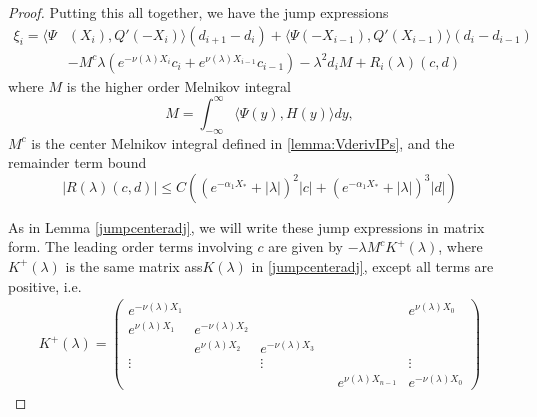\documentclass[thesis.tex]{subfiles}
\begin{document}
\begin{lemma}
\begin{proof}
Putting this all together, we have the jump expressions
\begin{align*}
\xi_i = \langle \Psi&(X_i), Q'(-X_i) \rangle (d_{i+1} - d_i ) + \langle \Psi(-X_{i-1}), Q'(X_{i-1}) \rangle (d_i - d_{i-1} ) \\
&- M^c \lambda( e^{-\nu(\lambda)X_i}c_i + e^{\nu(\lambda)X_{i-1}}c_{i-1})
- \lambda^2 d_i M + R_i(\lambda)(c, d)
\end{align*}
where $M$ is the higher order Melnikov integral
\[
M = \int_{-\infty}^\infty \langle \Psi(y), H(y) \rangle dy,
\]
$M^c$ is the center Melnikov integral defined in \cref{lemma:VderivIPs}, and the remainder term bound
\begin{equation}\label{noncenterR}
|R(\lambda)(c, d)| \leq C \left( (e^{-\alpha_1 X_*} + |\lambda|)^2 |c| + (e^{-\alpha_1 X_*} + |\lambda|)^3 |d| \right)
\end{equation}

As in Lemma \ref{jumpcenteradj}, we will write these jump expressions in matrix form. The leading order terms involving $c$ are given by $-\lambda M^c K^+(\lambda)$, where $K^+(\lambda)$ is the same matrix ass$K(\lambda)$ in \ref{jumpcenteradj}, except all terms are positive, i.e.
\begin{align*}
K^+(\lambda) =  
\begin{pmatrix}
e^{-\nu(\lambda)X_1} & & & & & e^{\nu(\lambda)X_0} \\
e^{\nu(\lambda)X_1} & e^{-\nu(\lambda)X_2} \\
& e^{\nu(\lambda)X_2} & e^{-\nu(\lambda)X_3} \\
\vdots & & \vdots & &&  \vdots \\
& & & & e^{\nu(\lambda)X_{n-1}} & e^{-\nu(\lambda)X_0} 
\end{pmatrix}
\end{align*}


\end{proof}
\end{lemma}
\end{document}
